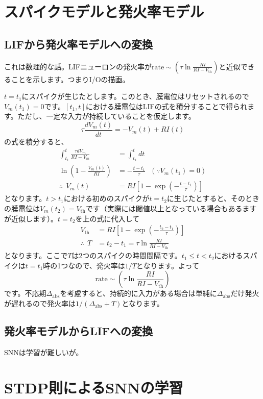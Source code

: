 \documentclass[11pt,dvipdfmx,b5paper,oneside]{jsbook}
\begin{document}
\section{スパイクモデルと発火率モデル}
\subsection{LIFから発火率モデルへの変換}
これは数理的な話。LIFニューロンの発火率が$\text{rate}\sim \left(\tau \ln \frac{RI}{RI-V_{\text{th}}}\right)$と近似できることを示します。つまりI/Oの描画。\par
$t=t_1$にスパイクが生じたとします。このとき、膜電位はリセットされるので$V_m(t_1)=0$です。$[t_1, t]$における膜電位はLIFの式を積分することで得られます。ただし、一定な入力が持続していることを仮定します。
$$
\tau \frac{dV_{m}(t)}{dt}=-V_{m}(t)+R I(t)
$$
の式を積分すると、
\begin{align*}
\int_{t_1}^{t} \frac{\tau dV_m}{RI-V_m}&=\int_{t_1}^{t} dt\\
\ln(1-\frac{V_m(t)}{RI})&=-\frac{t-t_1}{\tau} \ \ \ (\because V_m(t_1)=0)\\
\therefore\ \ V_m(t) &=RI\left[1-\exp\left(-\frac{t-t_1}{\tau}\right)\right] 
\end{align*}
となります。$t>t_1$における初めのスパイクが$t=t_2$に生じたとすると、そのときの膜電位は$V_m(t_2)=V_{\text{th}}$です（実際には閾値以上となっている場合もあるますが近似します）。$t=t_2$を上の式に代入して
\begin{align*}
V_{\text{th}}&=RI\left[1-\exp\left(-\frac{t_2-t_1}{\tau}\right)\right] \\
\therefore\ \ T&= t_2-t_1 =  \tau \ln \frac{RI}{RI-V_{\text{th}}}
\end{align*}
となります。ここで$T$は2つのスパイクの時間間隔です。$t_1\leq t<t_2$におけるスパイクは$t=t_1$時の1つなので、発火率は$1/T$となります。よって
$$
\text{rate}\sim \left(\tau \ln \frac{RI}{RI-V_{\text{th}}}\right)
$$
です。不応期$\Delta_{\text{abs}}$を考慮すると、持続的に入力がある場合は単純に$\Delta_{\text{abs}}$だけ発火が遅れるので発火率は$1/(\Delta_{\text{abs}}+T)$となります。
\subsection{発火率モデルからLIFへの変換}
SNNは学習が難しいが。

\section{STDP則によるSNNの学習}
\end{document}
